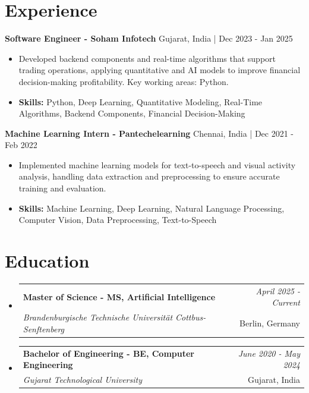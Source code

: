 \documentclass[a4paper,11pt]{article}
\makeatletter
\newcommand{\resumeSubheading}[4]{
\vspace{0.5mm}\item
    \begin{tabular*}{\linewidth}[t]{l@{\extracolsep{\fill}}r}
        \textbf{#1} & \textit{\footnotesize{#4}} \\
        \textit{\footnotesize{#3}} &  \footnotesize{#2}\\
    \end{tabular*}
    \vspace{-2.4mm}
}
\makeatother
\begin{document}
\section{\textbf{Experience}}


\vspace{1mm}
  \textbf{Software Engineer - Soham Infotech} \hfill Gujarat, India | Dec 2023 - Jan 2025
\vspace{-1.5mm} %
\begin{itemize}
  \item Developed backend components and real-time algorithms that support trading operations, applying quantitative and AI models to improve financial decision-making profitability. Key working areas: Python.

\vspace{-2mm}
  \item \textbf{Skills:} Python, Deep Learning, Quantitative Modeling, Real-Time Algorithms, Backend Components, Financial Decision-Making
\end{itemize}

\vspace{1mm}
  \textbf{Machine Learning Intern - Pantechelearning} \hfill Chennai, India | Dec 2021 - Feb 2022
\vspace{-1.5mm} %
\begin{itemize}
  \item Implemented machine learning models for text-to-speech and visual activity analysis, handling data extraction and preprocessing to ensure accurate training and evaluation.
\vspace{-2mm}
  \item \textbf{Skills:} Machine Learning, Deep Learning, Natural Language Processing, Computer Vision, Data Preprocessing, Text-to-Speech
\end{itemize}\section{\textbf{Education}}
\vspace{-0.4mm}

\begin{itemize}[leftmargin=0.15in, label={}]
\resumeSubheading
{Master of Science - MS, Artificial Intelligence }{Berlin, Germany}
{Brandenburgische Technische Universität Cottbus-Senftenberg  }{April 2025 - Current}

\vspace{1.0mm} %
\resumeSubheading
{Bachelor of Engineering - BE, Computer Engineering  }{Gujarat, India}
{Gujarat Technological University }{June 2020 - May 2024}

\end{itemize}
\end{document}
